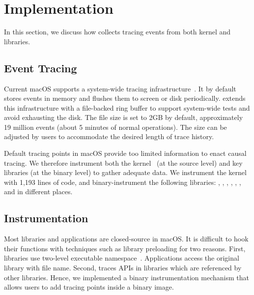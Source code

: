 \section{Implementation}\label{sec:implementation}

In this section, we discuss how \xxx collects tracing events from both kernel
and libraries.

\subsection{Event Tracing}

Current macOS supports a system-wide tracing
infrastructure~\cite{linktotracetool}. It by default stores events in memory and
flushes them to screen or disk periodically. \xxx extends this infrastructure
with a file-backed ring buffer to support system-wide tests and avoid
exhausting the disk. The file size is set to 2GB by default, approximately 19
million events (about 5 minutes of normal operations). The size can be adjusted by
users to accommodate the desired length of trace history.

Default tracing points in macOS provide too limited information to enact causal
tracing. We therefore instrument both the kernel~\cite{linkofxnusourcecode} (at
the source level) and key libraries (at the binary level) to gather adequate
data. We instrument the kernel with 1,193 lines of code, and binary-instrument
the following libraries: , ,
, , , ,
 and  in \nlibchanges different places.


\subsection{Instrumentation}

Most libraries and applications are closed-source in macOS. It is
difficult to hook their functions with techniques such as library
preloading for two reasons. First, libraries use two-level executable
namespace~\cite{twolayernamespace}. Applications access the original library
with file name. Second, \xxx traces APIs in libraries which are referenced by other
libraries. Hence, we implemented a binary instrumentation mechanism that
allows users to add tracing points inside a binary image.

